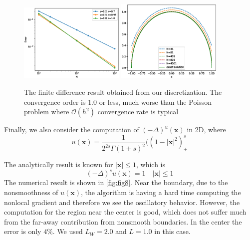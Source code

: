 \documentclass[10pt,a4paper]{article}
\newcommand{\bx}[0]{\mathbf{x}}
\theoremstyle{definition}
\begin{document}
\begin{figure}[H] %
\centering
\includegraphics[width=0.45\textwidth,keepaspectratio]{figures/fig6}
\includegraphics[width=0.45\textwidth,keepaspectratio]{figures/fig7}
\caption{The finite difference result obtained from our discretization. The convergence order is $1.0$ or less, much worse than the Poisson problem where $\mathcal{O}(h^2)$ convergence rate is typical}
\label{fig:fig6}
\end{figure}

Finally, we also consider the computation of $(-\Delta)^ u(\bx)$ in 2D, where
\begin{equation}
	u(\bx) = \frac{1}{2^{2s}\Gamma(1+s)^2} ((1-|\bx|^2)^s_+
\end{equation}

The analytically result is known for $|\bx|\leq 1$, which is
\begin{equation}\label{equ:u1}
	(-\Delta)^s u(\bx) = 1\quad |\bx|\leq 1
\end{equation}
The numerical result is shown in \cref{fig:fig8}. Near the boundary, due to the nonsmoothness of $u(\bx)$, the algorithm is having a hard time computing the nonlocal gradient and therefore we see the oscillatory behavior. However, the computation for the region near the center is  good, which does not suffer much from the far-away contribution from nonsmooth boundaries. In the center the error is only $4\%$. We used $L_W=2.0$ and $L=1.0$ in this case.  
\end{document}
